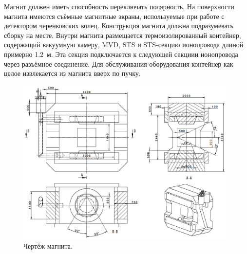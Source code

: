 Магнит должен иметь способность переключать полярность.
На поверхности магнита имеются съёмные магнитные экраны, используемые при работе с детектором черенковских колец. %
Конструкция магнита должна подразумевать сборку на месте.
Внутри магнита размещается термоизолированный контейнер, содержащий вакуумную камеру, MVD, STS и STS-секцию ионопровода длиной примерно 1.2~м. Эта секция подключается к следующей секциии ионопровода через разъёмное соединение. Для обслуживания оборудования контейнер как целое извлекается из магнита вверх по пучку.

\begin{figure}[H]
\includegraphics[width=0.98\textwidth]{pictures/Magnet_drawing.png}
\caption{Чертёж магнита.} %
\label{fig:MagnetDrawing}
\end{figure}


